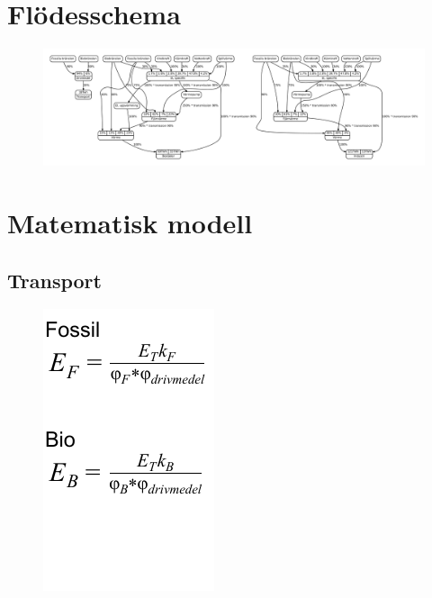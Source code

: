 \documentclass[a4paper,11pt,fleqn]{article}
\begin{document}
\appendix
\section{Flödesschema}
\begin{figure}[h!]
	\centering 
 		\includegraphics[scale = 0.2]{diagram.pdf}
		\label{diagram}
\end{figure}
\section {Matematisk modell}
\subsection{Transport}
\begin{figure}[h!]
	\centering 
 		\includegraphics[scale = 0.75]{transport2.pdf}
		\label{diagram}
\end{figure}
\end{document}
